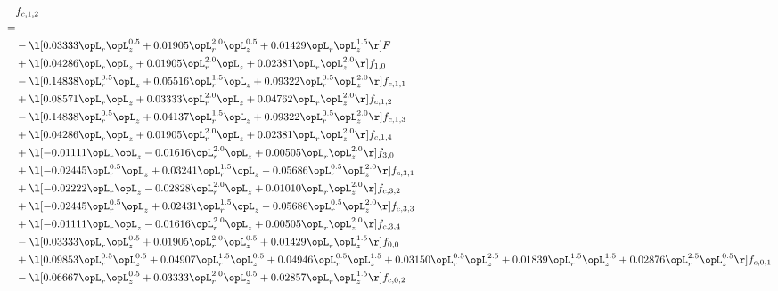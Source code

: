 \begin{alignat}{2} 
\label{eq:f_12_1} 
& f_{c,1,2} \nonumber \\ 
 = \\ 
& - \l[  0.03333 \opL_r \opL_z^{0.5} +  0.01905 \opL_r^{2.0} \opL_z^{0.5} +  0.01429 \opL_r \opL_z^{1.5}  \r] F \nonumber \\ 
& + \l[  0.04286 \opL_r \opL_z +  0.01905 \opL_r^{2.0} \opL_z +  0.02381 \opL_r \opL_z^{2.0}  \r] f_{1,0} \nonumber \\ 
& - \l[  0.14838 \opL_r^{0.5} \opL_z +  0.05516 \opL_r^{1.5} \opL_z +  0.09322 \opL_r^{0.5} \opL_z^{2.0}  \r] f_{c,1,1} \nonumber \\ 
& + \l[  0.08571 \opL_r \opL_z +  0.03333 \opL_r^{2.0} \opL_z +  0.04762 \opL_r \opL_z^{2.0}  \r] f_{c,1,2} \nonumber \\ 
& - \l[  0.14838 \opL_r^{0.5} \opL_z +  0.04137 \opL_r^{1.5} \opL_z +  0.09322 \opL_r^{0.5} \opL_z^{2.0}  \r] f_{c,1,3} \nonumber \\ 
& + \l[  0.04286 \opL_r \opL_z +  0.01905 \opL_r^{2.0} \opL_z +  0.02381 \opL_r \opL_z^{2.0}  \r] f_{c,1,4} \nonumber \\ 
& + \l[  -0.01111 \opL_r \opL_z   -0.01616 \opL_r^{2.0} \opL_z +  0.00505 \opL_r \opL_z^{2.0}  \r] f_{3,0} \nonumber \\ 
& + \l[  -0.02445 \opL_r^{0.5} \opL_z +  0.03241 \opL_r^{1.5} \opL_z   -0.05686 \opL_r^{0.5} \opL_z^{2.0}  \r] f_{c,3,1} \nonumber \\ 
& + \l[  -0.02222 \opL_r \opL_z   -0.02828 \opL_r^{2.0} \opL_z +  0.01010 \opL_r \opL_z^{2.0}  \r] f_{c,3,2} \nonumber \\ 
& + \l[  -0.02445 \opL_r^{0.5} \opL_z +  0.02431 \opL_r^{1.5} \opL_z   -0.05686 \opL_r^{0.5} \opL_z^{2.0}  \r] f_{c,3,3} \nonumber \\ 
& + \l[  -0.01111 \opL_r \opL_z   -0.01616 \opL_r^{2.0} \opL_z +  0.00505 \opL_r \opL_z^{2.0}  \r] f_{c,3,4} \nonumber \\ 
& - \l[  0.03333 \opL_r \opL_z^{0.5} +  0.01905 \opL_r^{2.0} \opL_z^{0.5} +  0.01429 \opL_r \opL_z^{1.5}  \r] f_{0,0} \nonumber \\ 
& + \l[  0.09853 \opL_r^{0.5} \opL_z^{0.5} +  0.04907 \opL_r^{1.5} \opL_z^{0.5} +  0.04946 \opL_r^{0.5} \opL_z^{1.5} +  0.03150 \opL_r^{0.5} \opL_z^{2.5} +  0.01839 \opL_r^{1.5} \opL_z^{1.5} +  0.02876 \opL_r^{2.5} \opL_z^{0.5}  \r] f_{c,0,1} \nonumber \\ 
& - \l[  0.06667 \opL_r \opL_z^{0.5} +  0.03333 \opL_r^{2.0} \opL_z^{0.5} +  0.02857 \opL_r \opL_z^{1.5}  \r] f_{c,0,2} \nonumber \\ 

\end{alignat}
